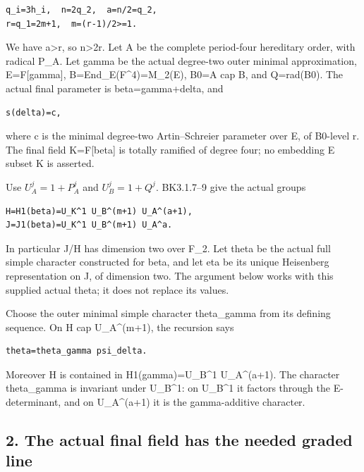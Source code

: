\begin{Verbatim}[fontsize=\small,breaklines=true,breakanywhere=true]
q_i=3h_i,  n=2q_2,  a=n/2=q_2,
r=q_1=2m+1,  m=(r-1)/2>=1.
\end{Verbatim}

We have a\textgreater r, so n\textgreater2r. Let A be the complete
period-four hereditary order, with radical P\_A. Let gamma be the actual
degree-two outer minimal approximation, E=F{[}gamma{]},
B=End\_E(F\^{}4)=M\_2(E), B0=A cap B, and Q=rad(B0). The actual final
parameter is beta=gamma+delta, and

\begin{Verbatim}[fontsize=\small,breaklines=true,breakanywhere=true]
s(delta)=c,
\end{Verbatim}

where c is the minimal degree-two Artin--Schreier parameter over E, of
B0-level r. The final field K=F{[}beta{]} is totally ramified of degree
four; no embedding E subset K is asserted.

Use \(U_A^j=1+P_A^j\) and \(U_B^j=1+Q^j\).
BK3.1.7--9 give the actual groups

\begin{Verbatim}[fontsize=\small,breaklines=true,breakanywhere=true]
H=H1(beta)=U_K^1 U_B^(m+1) U_A^(a+1),
J=J1(beta)=U_K^1 U_B^(m+1) U_A^a.
\end{Verbatim}

In particular J/H has dimension two over F\_2. Let theta be the actual
full simple character constructed for beta, and let eta be its unique
Heisenberg representation on J, of dimension two. The argument below
works with this supplied actual theta; it does not replace its values.

Choose the outer minimal simple character theta\_gamma from its defining
sequence. On H cap U\_A\^{}(m+1), the recursion says

\begin{Verbatim}[fontsize=\small,breaklines=true,breakanywhere=true]
theta=theta_gamma psi_delta.
\end{Verbatim}

Moreover H is contained in H1(gamma)=U\_B\^{}1 U\_A\^{}(a+1). The
character theta\_gamma is invariant under U\_B\^{}1: on U\_B\^{}1 it
factors through the E-determinant, and on U\_A\^{}(a+1) it is the
gamma-additive character.

\hypertarget{rank4-the-actual-final-field-has-the-needed-graded-line}{%
\subsection{2. The actual final field has the needed graded
line}\label{rank4-the-actual-final-field-has-the-needed-graded-line}}

